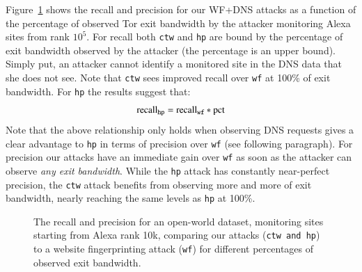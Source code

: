 Figure~\ref{fig:wfdns:torpct} shows the recall and precision for our WF+DNS
attacks as a function of the percentage of observed Tor exit bandwidth by the
attacker monitoring Alexa sites from rank $10^5$.
For recall both \texttt{ctw} and \texttt{hp} are bound by the
percentage of exit bandwidth observed by the attacker (the percentage is an
upper bound).
Simply put, an attacker cannot identify a monitored site in the DNS data that
she does not see. Note that \texttt{ctw} sees improved recall over \texttt{wf}
at 100\% of exit bandwidth. For \texttt{hp} the results suggest that:
\begin{equation}
	\label{eq:hprecall}
	\textnormal{recall}_{\texttt{hp}} = \textnormal{recall}_{\texttt{wf}} * \textnormal{pct}
\end{equation}
Note that the above relationship only holds when observing DNS requests gives
a clear advantage to \texttt{hp} in terms of precision over \texttt{wf} (see
following paragraph).
For precision our attacks have an immediate gain over \texttt{wf} as soon as
the attacker can observe \emph{any exit bandwidth}.
While the \texttt{hp} attack has constantly near-perfect precision, the
\texttt{ctw} attack benefits from observing more and more of exit bandwidth,
nearly reaching the same levels as \texttt{hp} at 100\%.


\begin{figure}[t]
\centering
{}
\caption{The recall and precision for an open-world dataset, monitoring sites
starting from Alexa rank 10k, comparing our attacks (\texttt{ctw and
 \texttt{hp}}) to a website fingerprinting attack (\texttt{wf}) for different
 percentages of observed exit bandwidth. }
\label{fig:wfdns:torpct}
\end{figure}


